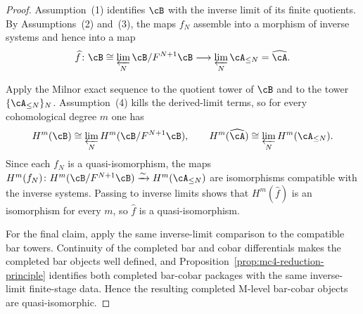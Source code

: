 \begin{proof}
Assumption~\textup{(1)} identifies $\cB$ with the inverse limit of its
finite quotients. By Assumptions~\textup{(2)} and~\textup{(3)}, the
maps $f_N$ assemble into a morphism of inverse systems and hence into a
map
\[
\widehat f\colon
\cB \cong \varprojlim_N \cB/F^{N+1}\cB \longrightarrow
\varprojlim_N \cA_{\le N}=\widehat{\cA}.
\]

Apply the Milnor exact sequence to the quotient tower of $\cB$ and to
the tower $\{\cA_{\le N}\}_N$. Assumption~\textup{(4)} kills the
derived-limit terms, so for every cohomological degree $m$ one has
\[
H^m(\cB)\cong \varprojlim_N H^m(\cB/F^{N+1}\cB),
\qquad
H^m(\widehat{\cA})\cong \varprojlim_N H^m(\cA_{\le N}).
\]
Since each $f_N$ is a quasi-isomorphism, the maps
$H^m(f_N)\colon H^m(\cB/F^{N+1}\cB)\xrightarrow{\sim}
H^m(\cA_{\le N})$ are isomorphisms compatible with the inverse systems.
Passing to inverse limits shows that $H^m(\widehat f)$ is an isomorphism
for every $m$, so $\widehat f$ is a quasi-isomorphism.

For the final claim, apply the same inverse-limit comparison to the
compatible bar towers. Continuity of the completed bar and cobar
differentials makes the completed bar objects well defined, and
Proposition~\ref{prop:mc4-reduction-principle} identifies both
completed bar-cobar packages with the same inverse-limit finite-stage
data. Hence the resulting completed M-level bar-cobar objects are
quasi-isomorphic.
\end{proof}

